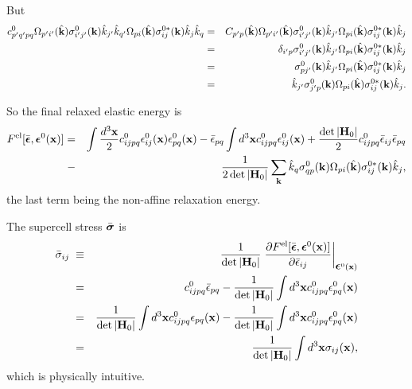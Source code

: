 \documentclass[12pt]{article}
\def\bmath#1{\mbox{\boldmath$#1$}}
\begin{document}
But 
\begin{eqnarray}
c^0_{p'q'pq} 
\Omega_{p'i'}(\hat{\bf k})\sigma^0_{i'j'}({\bf k}) \hat{k}_{j'} \hat{k}_{q'} 
\Omega_{pi}(\hat{\bf k})\sigma^{0*}_{ij}({\bf k}) \hat{k}_j \hat{k}_q
=&& 
 C_{p'p}(\hat{\bf k})\Omega_{p'i'}(\hat{\bf k})\sigma^0_{i'j'}({\bf k}) \hat{k}_{j'}\Omega_{pi}(\hat{\bf k})\sigma^{0*}_{ij}({\bf k}) \hat{k}_j
\nonumber\\ =&& 
 \delta_{i'p} \sigma^0_{i'j'}({\bf k}) \hat{k}_{j'}\Omega_{pi}(\hat{\bf k})\sigma^{0*}_{ij}({\bf k}) \hat{k}_j
\nonumber\\ =&& 
  \sigma^0_{pj'}({\bf k}) \hat{k}_{j'}\Omega_{pi}(\hat{\bf k})\sigma^{0*}_{ij}({\bf k}) \hat{k}_j
\nonumber\\ =&& 
  \hat{k}_{j'} \sigma^0_{j'p}({\bf k}) \Omega_{pi}(\hat{\bf k})\sigma^{0*}_{ij}({\bf k}) \hat{k}_j.
\end{eqnarray}

So the final relaxed elastic energy \cite{WangJK02} is 
\begin{eqnarray}
F^{\rm el}[\bar{\bmath{\epsilon}}, \bmath{\epsilon}^0({\bf x})] =&& 
 \int \frac{d^3{\bf x}}{2} c^0_{ijpq}
 \epsilon^0_{ij}({\bf x})  
 \epsilon^0_{pq}({\bf x}) - 
\bar{\epsilon}_{pq}\int d^3{\bf x} c^0_{ijpq} \epsilon^0_{ij}({\bf x}) 
+ 
\frac{\det|{\bf H}_0|}{2} c^0_{ijpq} \bar{\epsilon}_{ij} \bar{\epsilon}_{pq}
 \nonumber\\
-&& \frac{1}{2\det|{\bf H}_0|}\sum_{\bf k}
\hat{k}_q \sigma^0_{qp}({\bf k})
\Omega_{pi}(\hat{\bf k})\sigma^{0*}_{ij}({\bf k}) \hat{k}_j,
  \label{TotalElasticEnergyHomogeneousSolution}
\end{eqnarray}
the last term being the non-affine relaxation energy.

The supercell stress $\bar{\bmath{\sigma}}$ is 
\begin{eqnarray}
 \bar{\sigma}_{ij} \;\equiv&& \frac{1}{\det|{\bf H}_0|}
 \left.\frac{\partial F^{\rm el}[\bar{\bmath{\epsilon}},
 \bmath{\epsilon}^0({\bf x})]}{\partial
 \bar{\epsilon}_{ij}}\right|_{\bmath{\epsilon}^0({\bf x})} \nonumber\\
=&&
 c^0_{ijpq} \bar{\epsilon}_{pq} - \frac{1}{\det|{\bf H}_0|} \int d^3{\bf x} c^0_{ijpq} \epsilon^0_{pq}({\bf x})\nonumber\\
=&&
 \frac{1}{\det|{\bf H}_0|} \int d^3{\bf x} 
c^0_{ijpq} \epsilon_{pq}({\bf x}) - \frac{1}{\det|{\bf H}_0|} \int d^3{\bf x} c^0_{ijpq} \epsilon^0_{pq}({\bf x}) \nonumber\\
 =&& \frac{1}{\det|{\bf H}_0|} \int d^3{\bf x} \sigma_{ij}({\bf x}),
 \label{SupercellVirialStressHomogeneousSolution}
\end{eqnarray}
which is physically intuitive.
\end{document}
